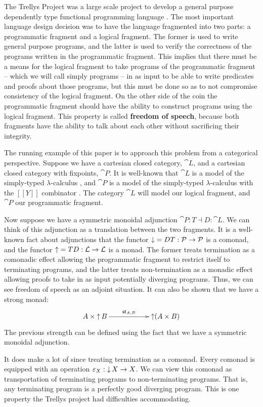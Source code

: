 The Trellys Project was a large scale project to develop a general
purpose dependently type functional programming language \cite{??}.
The most important language design decision was to have the language
fragmented into two parts: a programmatic fragment and a logical
fragment.  The former is used to write general purpose programs, and
the latter is used to verify the correctness of the programs written
in the programmatic fragment.  This implies that there must be a means
for the logical fragment to take programs of the programmatic fragment
-- which we will call simply programs -- in as input to be able to
write predicates and proofs about those programs, but this must be
done so as to not compromise consistency of the logical fragment.  On
the other side of the coin the programmatic fragment should have the
ability to construct programs using the logical fragment.  This
property is called \textbf{freedom of speech}, because both fragments
have the ability to talk about each other without sacrificing their
integrity.

The running example of this paper is to approach this problem from a
categorical perspective. Suppose we have a cartesian closed category,
$\cat{L}$, and a cartesian closed category with fixpoints, $\cat{P}$.
It is well-known that $\cat{L}$ is a model of the simply-typed
$\lambda$-calculus \cite{?}, and $\cat{P}$ is a model of the
simply-typed $\lambda$-calculus with the $[[Y]]$ combinator \cite{?}.
The category $\cat{L}$ will model our logical fragment, and $\cat{P}$
our programmatic fragment.

Now suppose we have a symmetric monoidal adjunction $\cat{P} : T
\dashv D : \cat{L}$. We can think of this adjunction as a translation
between the two fragments.  It is a well-known fact about adjunctions
that the functor $\mathop{\downarrow} = DT : \mathcal{P} \rightarrow \mathcal{P}$ is a comonad, and
the functor $\mathop{\uparrow} = TD : \mathcal{L} \rightarrow \mathcal{L}$ is a monad.  The former
treats termination as a comonadic effect allowing the programmatic
fragment to restrict itself to terminating programs, and the latter
treats non-termination as a monadic effect allowing proofs to take in
as input potentially diverging programs.  Thus, we can see freedom of
speech as an adjoint situation.  It can also be shown that we have a
strong monad:
\[
\bfig
\morphism<1000,0>[A \times \uar B`\uar(A \times B);\st{A,B}]
\efig
\]
The previous strength can be defined using the fact that we have a
symmetric monoidal adjunction.

It does make a lot of since treating termination as a comonad.  Every
comonad is equipped with an operation $\varepsilon_X : \mathop{\downarrow} X \rightarrow X$.
We can view this comonad as transportation of terminating programs to
non-terminating programs.  That is, any terminating program is a
perfectly good diverging program.  This is one property the Trellys
project had difficulties accommodating.

